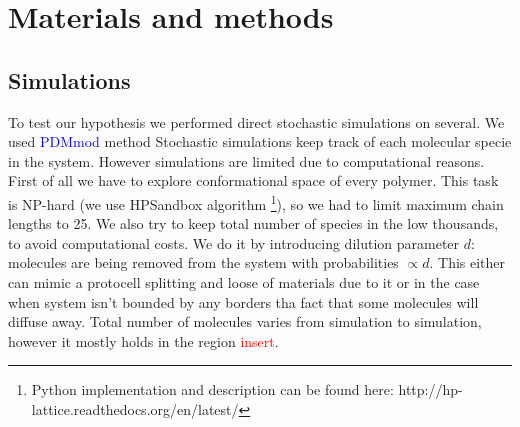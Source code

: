 \documentclass[twoside,twocolumn,9pt]{article}
\newcommand{\red}[1]{\textcolor{red}{#1}}
\newcommand{\blue}[1]{\textcolor{blue}{#1}}
\begin{document}
\section{Materials and methods}\label{sec:mat}
\subsection{Simulations}\label{sec:mat-sim}
To test our hypothesis we performed direct stochastic simulations on several. We used 
\blue{PDMmod} method \cite{Bernatskiy}
Stochastic simulations keep track of each 
molecular specie in the system. However simulations are limited due to computational reasons. First 
of all we have to explore conformational space of every polymer. This task is NP-hard (we use 
HPSandbox algorithm\cite{lau1989lattice,Dill2008} \footnote{Python implementation and description 
can be found here: http://hp-lattice.readthedocs.org/en/latest/}), so we had to limit 
maximum chain lengths to 25. We also try to keep total number of species in the low thousands, to 
avoid computational costs. We do it by introducing dilution parameter $d$: molecules are being 
removed from the system with probabilities $\propto d$. 
This either can mimic a protocell splitting and loose of materials due to it or in the case when system isn't bounded by any borders tha fact that some molecules will diffuse away. Total number of molecules varies from simulation to simulation, 
however it mostly holds in the region \red{insert}.
\end{document}
